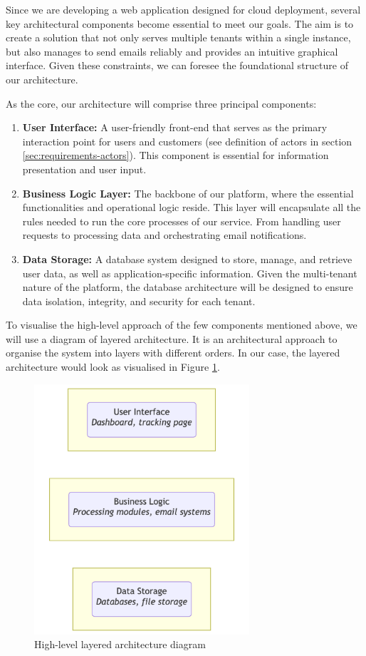 Since we are developing a web application designed for cloud deployment, several key architectural components become essential to meet our goals.
The aim is to create a solution that not only serves multiple tenants within a single instance, but also manages to send emails reliably and provides an intuitive graphical interface.
Given these constraints, we can foresee the foundational structure of our architecture.

As the core, our architecture will comprise three principal components:
\begin{enumerate}
    \item \textbf{User Interface:} A user-friendly front-end that serves as the primary interaction point for users and customers (see definition of actors in section \ref{sec:requirements-actors}). This component is essential for information presentation and user input.
    \item \textbf{Business Logic Layer:} The backbone of our platform, where the essential functionalities and operational logic reside. This layer will encapsulate all the rules needed to run the core processes of our service. From handling user requests to processing data and orchestrating email notifications.
    \item \textbf{Data Storage:} A database system designed to store, manage, and retrieve user data, as well as application-specific information. Given the multi-tenant nature of the platform, the database architecture will be designed to ensure data isolation, integrity, and security for each tenant.
\end{enumerate}

To visualise the high-level approach of the few components mentioned above, we will use a diagram of layered architecture. 
It is an architectural approach to organise the system into layers with different orders. 
In our case, the layered architecture would look as visualised in Figure \ref{img03:layered_architecture_diagram}.

\begin{figure}[H]\centering
\includegraphics[width=80mm]{img/chap03/fig_layered_architecture_mermaid.png}
\caption{High-level layered architecture diagram}
\label{img03:layered_architecture_diagram}
\end{figure}

